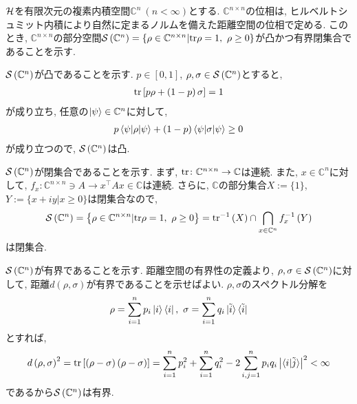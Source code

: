 \begin{ex}
    \label{ex9.9}
    $\mathcal{H}$を有限次元の複素内積空間$\mathbb{C}^n \ \left(n < \infty\right)$とする. $\mathbb{C}^{n \times n}$の位相は, ヒルベルトシュミット内積により自然に定まるノルムを備えた距離空間の位相で定める. このとき, $\mathbb{C}^{n \times n}$の部分空間$\mathcal{S}\left({\mathbb{C}^{n}}\right) = \left\{ \rho \in \mathbb{C}^{n \times n} | \mathrm{tr}\rho = 1,\  \rho \ge 0\right\}$が凸かつ有界閉集合であることを示す.

    $\mathcal{S}\left({\mathbb{C}^{n}}\right)$が凸であることを示す. $p \in \left[0,1\right]$, $\rho, \sigma \in \mathcal{S}\left({\mathbb{C}^{n}}\right)$とすると, 
    \begin{align*}
        \mathrm{tr}\left[ p \rho + \left(1-p\right)\sigma\right] = 1
    \end{align*}
    が成り立ち, 任意の$\ket{\psi} \in \mathbb{C}^n$に対して, 
    \begin{align*}
        p \braket{\psi|\rho|\psi} + (1-p) \braket{\psi|\sigma|\psi} \ge 0
    \end{align*}
    が成り立つので, $\mathcal{S}\left({\mathbb{C}^{n}}\right)$は凸.

    $\mathcal{S}\left({\mathbb{C}^{n}}\right)$が閉集合であることを示す. まず, $\mathrm{tr} \colon \mathbb{C}^{n \times n} \to \mathbb{C}$は連続. また, $x \in \mathbb{C}^{n}$に対して, $f_x \colon \mathbb{C}^{n \times n} \ni A \to x^\top A x \in \mathbb{C}$は連続. さらに, $\mathbb{C}$の部分集合$X := \{1\}$, $ Y := \{x + iy | x \ge 0\}$は閉集合なので, 
    \begin{align*}
        \mathcal{S}\left({\mathbb{C}^{n}}\right)
        =
        \left\{ \rho \in \mathbb{C}^{n \times n} | \mathrm{tr}\rho = 1, \ \rho \ge 0\right\}
        =
        \mathrm{tr}^{-1}\left(X\right)
        \cap
        \bigcap_{x \in \mathbb{C}^n} f_x^{-1}\left(Y\right)
    \end{align*}
    は閉集合. 

    $\mathcal{S}\left({\mathbb{C}^{n}}\right)$が有界であることを示す. 距離空間の有界性の定義より, $\rho, \sigma \in \mathcal{S}\left({\mathbb{C}^n}\right)$に対して, 距離$d\left(\rho, \sigma\right)$が有界であることを示せばよい. $\rho, \sigma$のスペクトル分解を
    \begin{align}
        \rho = \sum_{i=1}^n p_i \ket{i}\bra{i}, \ \sigma = \sum_{i=1}^n q_i \ket{\tilde{i}}\bra{\tilde{i}}
    \end{align}
    とすれば, 
    \begin{align*}
        d \left(\rho, \sigma\right)^2 
        =
        \mathrm{tr}\left[ \left(\rho-\sigma\right)\left(\rho-\sigma\right)\right] 
        =
        \sum_{i=1}^n p_i^2 + \sum_{i=1}^n q_i^2 - 2 \sum_{i,j = 1}^n p_i q_i \left| \braket{i|\tilde{j}}\right|^2 < \infty
    \end{align*}
    であるから$\mathcal{S}\left({\mathbb{C}^{n}}\right)$は有界.


\end{ex}
